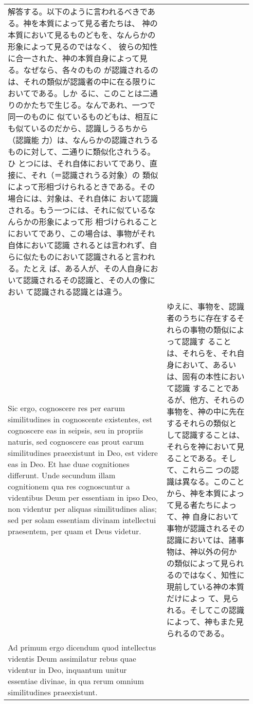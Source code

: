 \documentclass[10pt]{jsarticle} %
\begin{document}
\begin{longtable}{p{21em}p{21em}}
解答する。以下のように言われるべきである。神を本質によって見る者たちは、
神の本質において見るものどもを、なんらかの形象によって見るのではなく、
彼らの知性に合一された、神の本質自身によって見る。なぜなら、各々のもの
が認識されるのは、それの類似が認識者の中に在る限りにおいてである。しか
るに、このことは二通りのかたちで生じる。なんであれ、一つで同一のものに
似ているものどもは、相互にも似ているのだから、認識しうるちから（認識能
力）は、なんらかの認識されうるものに対して、二通りに類似化されうる。ひ
とつには、それ自体においてであり、直接に、それ（＝認識されうる対象）の
類似によって形相づけられるときである。その場合には、対象は、それ自体に
おいて認識される。もう一つには、それに似ているなんらかの形象によって形
相づけられることにおいてであり、この場合は、事物がそれ自体において認識
されるとは言われず、自らに似たものにおいて認識されると言われる。たとえ
ば、ある人が、その人自身において認識されるその認識と、その人の像におい
て認識される認識とは違う。


\\

Sic ergo, cognoscere res per earum similitudines in cognoscente
existentes, est cognoscere eas in seipsis, seu in propriis naturis,
sed cognoscere eas prout earum similitudines praeexistunt in Deo, est
videre eas in Deo. Et hae duae cognitiones differunt. Unde secundum
illam cognitionem qua res cognoscuntur a videntibus Deum per essentiam
in ipso Deo, non videntur per aliquas similitudines alias; sed per
solam essentiam divinam intellectui praesentem, per quam et Deus
videtur.


&


ゆえに、事物を、認識者のうちに存在するそれらの事物の類似によって認識す
ることは、それらを、それ自身において、あるいは、固有の本性において認識
することであるが、他方、それらの事物を、神の中に先在するそれらの類似と
して認識することは、それらを神において見ることである。そして、これら二
つの認識は異なる。このことから、神を本質によって見る者たちによって、神
自身において事物が認識されるその認識においては、諸事物は、神以外の何か
の類似によって見られるのではなく、知性に現前している神の本質だけによっ
て、見られる。そしてこの認識によって、神もまた見られるのである。

\\


{\sc  Ad primum ergo dicendum} quod intellectus videntis Deum
 assimilatur rebus quae videntur in Deo, inquantum unitur essentiae
 divinae, in qua rerum omnium similitudines praeexistunt.

&


\end{longtable}
\end{document}
